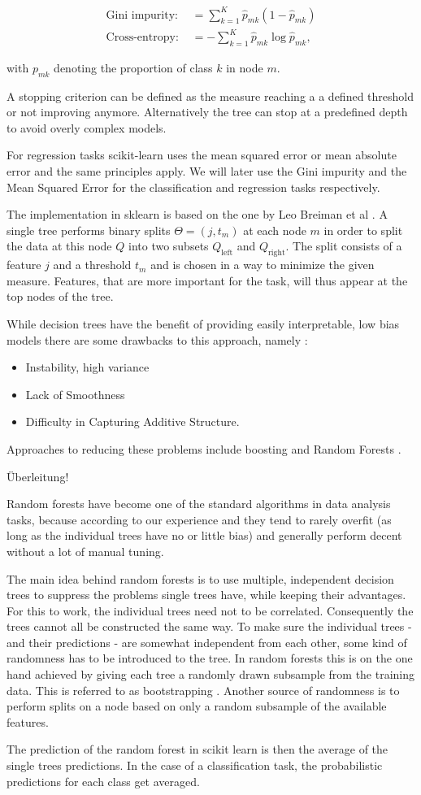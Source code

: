 \begin{align}
	\text{Gini impurity: } &= \sum_{k=1}^K \hat{p}_{mk}(1-\hat{p}_{mk}) \\
	\text{Cross-entropy: } &= -\sum_{k=1}^K \hat{p}_{mk}\log{\hat{p}_{mk}},
  \label{eq:gini_ce}
\end{align}

with $p_{mk}$ denoting the proportion of class $k$ in node $m$.

A stopping criterion can be defined as the measure reaching a
a defined threshold or not improving anymore.
Alternatively the tree can stop at a predefined depth to
avoid overly complex models.

For regression tasks scikit-learn uses the mean squared error
or mean absolute error and the same principles apply.
We will later use the Gini impurity and the Mean Squared Error
for the classification and regression tasks respectively.

The implementation in sklearn is based on the one by
Leo Breiman et al \cite{breimanclassification}.
A single tree performs binary splits $\Theta = (j, t_m)$
at each node $m$ in order to split
the data at this node $Q$ into two subsets
$Q_\text{left}$
and
$Q_\text{right}$.
The split consists of a feature $j$ and a threshold $t_m$ and is
chosen in a way to minimize the given measure.
Features, that are more important for the task, will
thus appear at the top nodes of the tree.


While decision trees have the benefit of providing
easily interpretable, low bias models there are some drawbacks to this
approach, namely \cite{hastie2017springer}:
\begin{itemize}
  \item{Instability, high variance}
  \item{Lack of Smoothness}
  \item{Difficulty in Capturing Additive Structure}.
\end{itemize}

Approaches to reducing these problems include
boosting \cite{freund1997decision} and Random Forests \cite{Breiman2001}.

Überleitung!

Random forests have become one of the standard algorithms
in data analysis tasks, because according to our
experience and \cite{hastie2017springer} they tend to
rarely overfit (as long as the individual trees have no or little bias)
and generally perform decent without a lot of manual tuning.

The main idea behind random forests is to use multiple, independent
decision trees to suppress the problems single trees have, while
keeping their advantages.
For this to work, the individual trees need not to be correlated.
Consequently the trees cannot all be constructed the same way.
To make sure the individual trees
- and their predictions -
are somewhat independent from each other,
some kind of randomness has to be introduced to the tree.
In random forests this is on the one hand achieved by giving each tree a
randomly drawn subsample from the training data.
This is referred to as bootstrapping \cite{efron1992bootstrap}.
Another source of randomness is to perform splits on a node
based on only a random subsample of the available features.

The prediction of the random forest in scikit learn is then the average of
the single trees predictions.
In the case of a classification task, the probabilistic predictions for each class
get averaged.